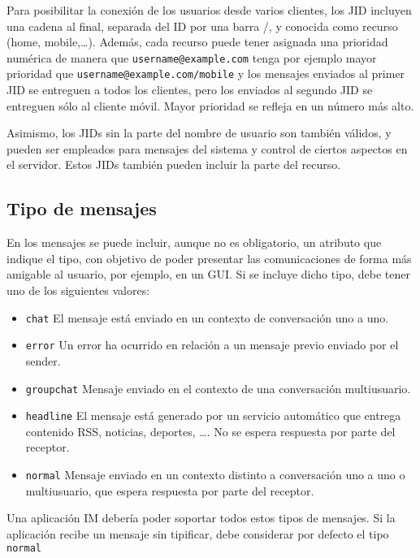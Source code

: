 \documentclass[a4paper, 11pt]{article} %
\begin{document}
  Para posibilitar la conexión de los usuarios desde varios clientes, los JID incluyen una cadena al final, separada
  del ID por una barra /, y conocida como recurso (home, mobile,\ldots). Además, cada recurso puede
  tener asignada una prioridad numérica de manera que \texttt{username@example.com} tenga por ejemplo mayor prioridad que 
  \texttt{username@example.com/mobile} y los mensajes enviados al primer JID se entreguen a todos los clientes,
  pero los enviados al segundo JID se entreguen sólo al cliente móvil. Mayor prioridad se refleja en un número más alto.
  
  Asimismo, los JIDs sin la parte del nombre de usuario son también válidos, y pueden ser empleados para mensajes del
  sistema y control de ciertos aspectos en el servidor. Estos JIDs también pueden incluir la parte del recurso.
  
  
  \subsection{Tipo de mensajes}
    En los mensajes se puede incluir, aunque no es obligatorio, un atributo que indique el tipo, con objetivo de poder
    presentar las comunicaciones de forma más amigable al usuario, por ejemplo, en un GUI. Si se incluye dicho tipo, debe
    tener uno de los siguientes valores:
    \begin{itemize}
     \item \texttt{chat} El mensaje está enviado en un contexto de conversación uno a uno.
     \item \texttt{error} Un error ha ocurrido en relación a un mensaje previo enviado por el sender.
     \item \texttt{groupchat} Mensaje enviado en el contexto de una conversación multiusuario.
     \item \texttt{headline} El mensaje está generado por un servicio automático que entrega contenido RSS, noticias, 
     deportes, \ldots. No se espera respuesta por parte del receptor.
     \item \texttt{normal} Mensaje enviado en un contexto distinto a conversación uno a uno o multiusuario, que espera
     respuesta por parte del receptor.
    \end{itemize}
    Una aplicación IM debería poder soportar todos estos tipos de mensajes. Si la aplicación recibe un mensaje sin tipificar,
    debe considerar por defecto el tipo \texttt{normal}  
  
\end{document}
